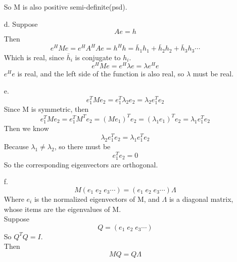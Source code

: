 \documentclass[10pt]{article}
\begin{document}
\begin{enumerate}
\begin{equation}
\end{equation}
So M is also positive semi-definite(psd).
\item[d.]
Suppose \\
\begin{equation}
Ae=h
\end{equation}
Then \\
\begin{equation}
e^HMe=e^HA^HAe=h^Hh=\bar{h}_1h_1+\bar{h}_2h_2+\bar{h}_3h_3\dotsm
\end{equation}
Which is real, since $\bar{h}_i$ is conjugate to $h_i$.
\begin{equation}
e^HMe=e^H\lambda e=\lambda e^He
\end{equation}
$e^He$ is real, and the left side of the function is also real, so $\lambda$ must be real.
\item[e.] 
\begin{equation}
e_1^TMe_2=e_1^T\lambda_2e_2=\lambda_2 e_1^Te_2
\end{equation}
Since M is symmetric, then \\
\begin{equation}
e_1^TMe_2=e_1^TM^Te_2=(Me_1)^Te_2=(\lambda_1e_1)^Te_2=\lambda_1e_1^Te_2
\end{equation}
Then we know \\
\begin{equation}
\lambda_2 e_1^Te_2=\lambda_1e_1^Te_2
\end{equation}
Because $\lambda_1\neq\lambda_2$, so there must be \\
\begin{equation}
e_1^Te_2=0
\end{equation}
So the corresponding eigenvectors are orthogonal. \\
\item[f.]
\begin{equation}
M(e_1\; e_2\; e_3 \dotsm)=(e_1\; e_2\; e_3 \dotsm)\Lambda
\end{equation}
Where $e_i$ is the normalized eigenvectors of M, and $\Lambda$ is a diagonal matrix, whose items are the eigenvalues of M.\\
Suppose \\
\begin{equation}
Q=(e_1\; e_2\; e_3 \dotsm)
\end{equation} 
So $Q^TQ=I$. \\
Then \\
\begin{equation}
MQ=Q\Lambda
\end{equation}

\end{enumerate}
\end{document}
